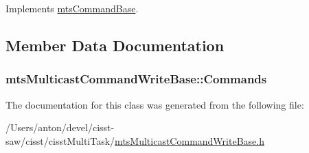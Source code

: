 Implements \hyperlink{classmts_command_base_a0885ce7a5321d7b672694ade780b9d64}{mts\+Command\+Base}.



\subsection{Member Data Documentation}
\hypertarget{classmts_multicast_command_write_base_a908fccc3c249bf9a0919f2294defc73e}{}
\subsubsection[{Commands}]{ mts\+Multicast\+Command\+Write\+Base\+::\+Commands\hspace{0.3cm}{\ttfamily [protected]}}\label{classmts_multicast_command_write_base_a908fccc3c249bf9a0919f2294defc73e}


The documentation for this class was generated from the following file\+:\begin{DoxyCompactItemize}
\item 
/\+Users/anton/devel/cisst-\/saw/cisst/cisst\+Multi\+Task/\hyperlink{mts_multicast_command_write_base_8h}{mts\+Multicast\+Command\+Write\+Base.\+h}\end{DoxyCompactItemize}
